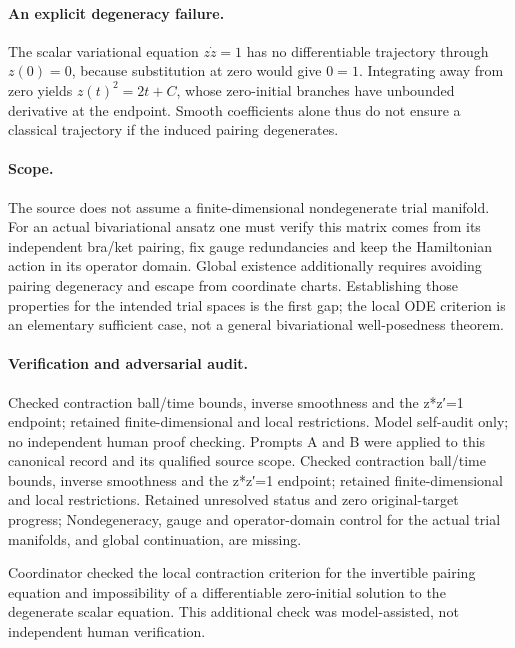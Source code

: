 \documentclass[11pt]{article}
\begin{document}
\paragraph{An explicit degeneracy failure.} The scalar variational equation $z\dot z=1$ has no differentiable trajectory through $z(0)=0$, because substitution at zero would give $0=1$. Integrating away from zero yields $z(t)^2=2t+C$, whose zero-initial branches have unbounded derivative at the endpoint. Smooth coefficients alone thus do not ensure a classical trajectory if the induced pairing degenerates.

\paragraph{Scope.} The source does not assume a finite-dimensional nondegenerate trial manifold. For an actual bivariational ansatz one must verify this matrix comes from its independent bra/ket pairing, fix gauge redundancies and keep the Hamiltonian action in its operator domain. Global existence additionally requires avoiding pairing degeneracy and escape from coordinate charts. Establishing those properties for the intended trial spaces is the first gap; the local ODE criterion is an elementary sufficient case, not a general bivariational well-posedness theorem.

\paragraph{Verification and adversarial audit.}
Checked contraction ball/time bounds, inverse smoothness and the z*z′=1 endpoint; retained finite-dimensional and local restrictions. Model self-audit only; no independent human proof checking. Prompts A and B were applied to this canonical record and its qualified source scope. Checked contraction ball/time bounds, inverse smoothness and the z*z′=1 endpoint; retained finite-dimensional and local restrictions. Retained unresolved status and zero original-target progress; Nondegeneracy, gauge and operator-domain control for the actual trial manifolds, and global continuation, are missing.

Coordinator checked the local contraction criterion for the invertible pairing equation and impossibility of a differentiable zero-initial solution to the degenerate scalar equation. This additional check was model-assisted, not independent human verification.
\end{document}
